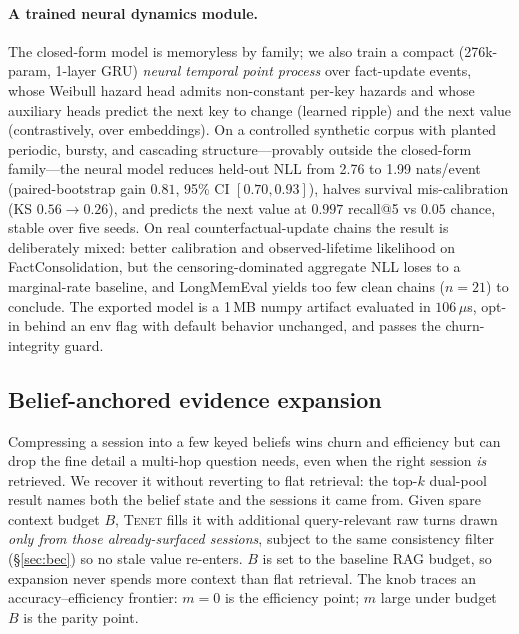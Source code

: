 \documentclass[11pt]{article}
\newcommand{\tenet}{\textsc{Tenet}}
\begin{document}
\paragraph{A trained neural dynamics module.} The closed-form model is memoryless by
family; we also train a compact (276k-param, 1-layer GRU) \emph{neural temporal point
process} over fact-update events, whose Weibull hazard head admits non-constant
per-key hazards and whose auxiliary heads predict the next key to change (learned
ripple) and the next value (contrastively, over embeddings). On a controlled synthetic
corpus with planted periodic, bursty, and cascading structure---provably outside the
closed-form family---the neural model reduces held-out NLL from 2.76 to 1.99
nats/event (paired-bootstrap gain $0.81$, 95\% CI $[0.70, 0.93]$), halves survival
mis-calibration (KS $0.56\!\to\!0.26$), and predicts the next value at $0.997$
recall@5 vs $0.05$ chance, stable over five seeds. On real counterfactual-update
chains the result is deliberately mixed: better calibration and observed-lifetime
likelihood on FactConsolidation, but the censoring-dominated aggregate NLL loses to a
marginal-rate baseline, and LongMemEval yields too few clean chains ($n{=}21$) to
conclude. The exported model is a 1\,MB numpy artifact evaluated in $106\,\mu$s,
opt-in behind an env flag with default behavior unchanged, and passes the
churn-integrity guard.

\subsection{Belief-anchored evidence expansion}\label{sec:expansion}
Compressing a session into a few keyed beliefs wins churn and efficiency but can drop the
fine detail a multi-hop question needs, even when the right session \emph{is} retrieved.
We recover it without reverting to flat retrieval: the top-$k$ dual-pool result names both
the belief state and the sessions it came from. Given spare context budget $B$, \tenet{}
fills it with additional query-relevant raw turns drawn \emph{only from those
already-surfaced sessions}, subject to the same consistency filter (\S\ref{sec:bec}) so no
stale value re-enters. $B$ is set to the baseline RAG budget, so expansion never spends
more context than flat retrieval. The knob traces an accuracy--efficiency frontier: $m=0$
is the efficiency point; $m$ large under budget $B$ is the parity point.
\end{document}
